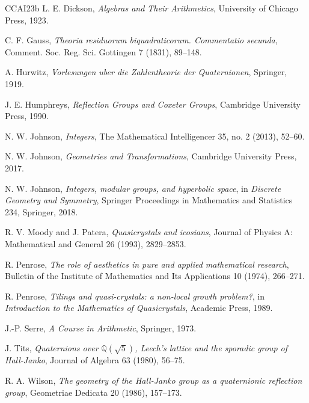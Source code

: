 \documentclass[12pt,oneside,english]{amsart}
\numberwithin{equation}{section}
\numberwithin{figure}{section}
\numberwithin{table}{section}
\theoremstyle{plain}
\theoremstyle{definition}
\theoremstyle{remark}
\newcommand{\QQ}{\mathbb Q}
\begin{document}
\begin{thebibliography}{CCAI23b}
L. E. Dickson, \emph{Algebras and Their Arithmetics}, University of Chicago Press, 1923.

C. F. Gauss, \emph{Theoria residuorum biquadraticorum. Commentatio secunda}, Comment. Soc. Reg. Sci. Gottingen 7 (1831), 89--148.

A. Hurwitz, \emph{Vorlesungen uber die Zahlentheorie der Quaternionen}, Springer, 1919.

J. E. Humphreys, \emph{Reflection Groups and Coxeter Groups}, Cambridge University Press, 1990.

N. W. Johnson, \emph{Integers}, The Mathematical Intelligencer 35, no. 2 (2013), 52--60.

N. W. Johnson, \emph{Geometries and Transformations}, Cambridge University Press, 2017.

N. W. Johnson, \emph{Integers, modular groups, and hyperbolic space}, in \emph{Discrete Geometry and Symmetry}, Springer Proceedings in Mathematics and Statistics 234, Springer, 2018.

R. V. Moody and J. Patera, \emph{Quasicrystals and icosians}, Journal of Physics A: Mathematical and General 26 (1993), 2829--2853.

R. Penrose, \emph{The role of aesthetics in pure and applied mathematical research}, Bulletin of the Institute of Mathematics and Its Applications 10 (1974), 266--271.

R. Penrose, \emph{Tilings and quasi-crystals: a non-local growth problem?}, in \emph{Introduction to the Mathematics of Quasicrystals}, Academic Press, 1989.

J.-P. Serre, \emph{A Course in Arithmetic}, Springer, 1973.

J. Tits, \emph{Quaternions over \(\QQ(\sqrt5)\), Leech's lattice and the sporadic group of Hall-Janko}, Journal of Algebra 63 (1980), 56--75.

R. A. Wilson, \emph{The geometry of the Hall-Janko group as a quaternionic reflection group}, Geometriae Dedicata 20 (1986), 157--173.

\end{thebibliography}
\end{document}
